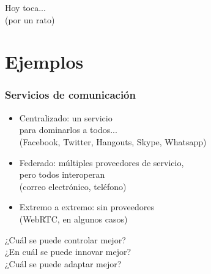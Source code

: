 \documentclass[17pt,aspectratio=169]{beamer}
\begin{document}

\begin{frame}

\begin{center}
{\Huge
Hoy toca... \\
(por un rato) \\
}
\end{center}

\end{frame}


\section{Ejemplos}



\begin{frame}
\frametitle{Servicios de comunicación}

  \begin{itemize}
  \item Centralizado: un servicio \\
    para dominarlos a todos... \\
    (Facebook, Twitter, Hangouts, Skype, Whatsapp)
  \item Federado: múltiples proveedores de servicio, \\
    pero todos interoperan \\
    (correo electrónico, teléfono)
  \item Extremo a extremo: sin proveedores \\
    (WebRTC, en algunos casos)
  \end{itemize}

  \begin{flushright}
¿Cuál se puede controlar mejor? \\

¿En cuál se puede innovar mejor? \\

    ¿Cuál se puede adaptar mejor? \\
    \end{flushright}

\end{frame}

\end{document}
